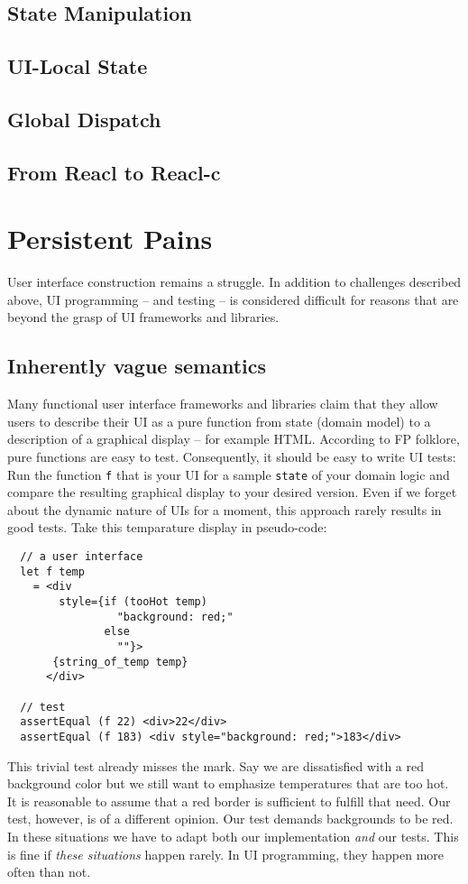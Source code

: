\documentclass[sigplan,screen]{acmart}
\begin{document}
\subsection{State Manipulation}

\subsection{UI-Local State}

\subsection{Global Dispatch}

\subsection{From Reacl to Reacl-c}


\section{Persistent Pains}

User interface construction remains a struggle. In addition to
challenges described above, UI programming -- and testing -- is
considered difficult for reasons that are beyond the grasp of UI
frameworks and libraries.

\subsection{Inherently vague semantics}

Many functional user interface frameworks and libraries claim that
they allow users to describe their UI as a pure function from state
(domain model) to a description of a graphical display -- for example
HTML. According to FP folklore, pure functions are easy to
test. Consequently, it should be easy to write UI tests: Run the
function \texttt{f} that is your UI for a sample \texttt{state} of
your domain logic and compare the resulting graphical display to your
desired version. Even if we forget about the dynamic nature of UIs for
a moment, this approach rarely results in good tests. Take this
temparature display in pseudo-code:
%
\begin{verbatim}
  // a user interface
  let f temp
    = <div
        style={if (tooHot temp)
                 "background: red;"
               else
                 ""}>
       {string_of_temp temp}
      </div>

  // test
  assertEqual (f 22) <div>22</div>
  assertEqual (f 183) <div style="background: red;">183</div>
\end{verbatim}
%
This trivial test already misses the mark. Say we are dissatisfied
with a red background color but we still want to emphasize
temperatures that are too hot. It is reasonable to assume that a red
border is sufficient to fulfill that need. Our test, however, is of a
different opinion. Our test demands backgrounds to be red. In these
situations we have to adapt both our implementation \textit{and} our
tests. This is fine if \textit{these situations} happen rarely. In UI
programming, they happen more often than not.
\end{document}
